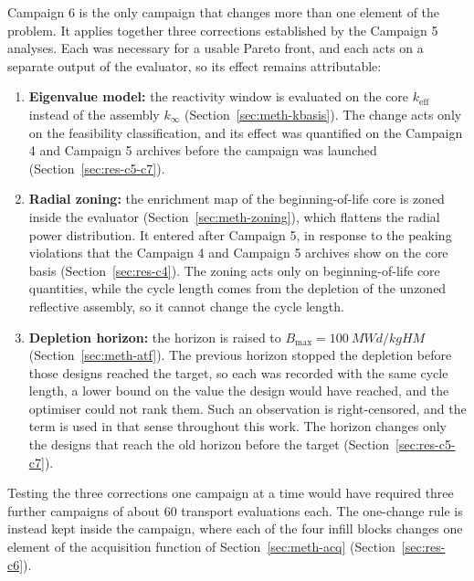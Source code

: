 Campaign 6 is the only campaign that changes more than one element of
the problem. It applies together three corrections established by the
Campaign 5 analyses. Each was necessary for a usable Pareto front, and
each acts on a separate output of the evaluator, so its effect remains
attributable:

\begin{enumerate}
  \item \textbf{Eigenvalue model:} the reactivity window is evaluated
        on the core $k_\mathrm{eff}$ instead of the assembly $k_\infty$
        (Section~\ref{sec:meth-kbasis}). The change acts only on the
        feasibility classification, and its effect was quantified on the
        Campaign 4 and Campaign 5 archives before the campaign was
        launched (Section~\ref{sec:res-c5-c7}).

  \item \textbf{Radial zoning:} the enrichment map of the
        beginning-of-life core is zoned inside the evaluator
        (Section~\ref{sec:meth-zoning}), which flattens the radial power
        distribution. It entered after Campaign 5, in response to the
        peaking violations that the Campaign 4 and Campaign 5 archives
        show on the core basis (Section~\ref{sec:res-c4}). The zoning
        acts only on beginning-of-life core quantities, while the cycle
        length comes from the depletion of the unzoned reflective
        assembly, so it cannot change the cycle length.

  \item \textbf{Depletion horizon:} the horizon is raised to
        $B_\mathrm{max} = \SI{100}{MWd/kgHM}$
        (Section~\ref{sec:meth-atf}). The previous horizon stopped the
        depletion before those designs reached the target, so each was
        recorded with the same cycle length, a lower bound on the value
        the design would have reached, and the optimiser could not rank
        them. Such an observation is right-censored, and the term is
        used in that sense throughout this work. The horizon changes only the designs that
        reach the old horizon before the target
        (Section~\ref{sec:res-c5-c7}).
\end{enumerate}

Testing the three corrections one campaign at a time would have required
three further campaigns of about 60 transport evaluations each. The
one-change rule is instead kept inside the campaign, where each of the
four infill blocks changes one element of the acquisition function of
Section~\ref{sec:meth-acq} (Section~\ref{sec:res-c6}).

